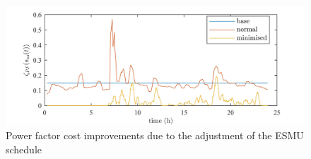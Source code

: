 \begin{figure}\centering
	\includegraphics{_chapter1/fig/results/ts-power-factor}
\caption{Power factor cost improvements due to the adjustment of the ESMU schedule}
\label{ch1:fig:ts-power-factor}
\end{figure}